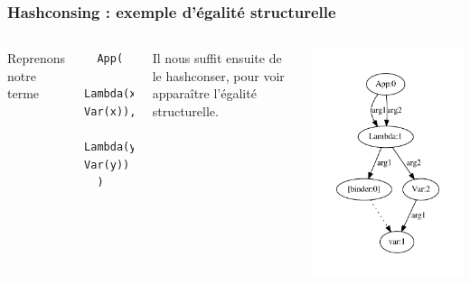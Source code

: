 \begin{frame}[fragile]
\frametitle{Hashconsing : exemple d'égalité structurelle}

\begin{columns}
  Reprenons notre terme 
  \begin{verbatim}
  App(
     Lambda(x, Var(x)), 
     Lambda(y, Var(y))
  )
  \end{verbatim}

  \medskip
  
  Il nous suffit ensuite de le hashconser, pour voir apparaître l'égalité structurelle.
  
    \begin{center}
      \includegraphics[scale=0.6]{pattern/pres_hash.pdf}
    \end{center}

\end{columns}
\end{frame}
